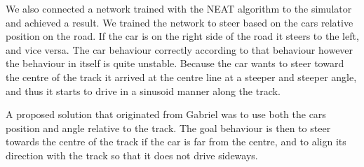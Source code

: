 We also connected a network trained with the NEAT algorithm to the simulator and achieved a result. We trained the network to steer based on the cars relative position on the road. If the car is on the right side of the road it steers to the left, and vice versa. The car behaviour correctly according to that behaviour however the behaviour in itself is quite unstable. Because the car wants to steer toward the centre of the track it arrived at the centre line at a steeper and steeper angle, and thus it starts to drive in a sinusoid manner along the track.

A proposed solution that originated from Gabriel was to use both the cars position and angle relative to the track. The goal behaviour is then to steer towards the centre of the track if the car is far from the centre, and to align its direction with the track so that it does not drive sideways. 

